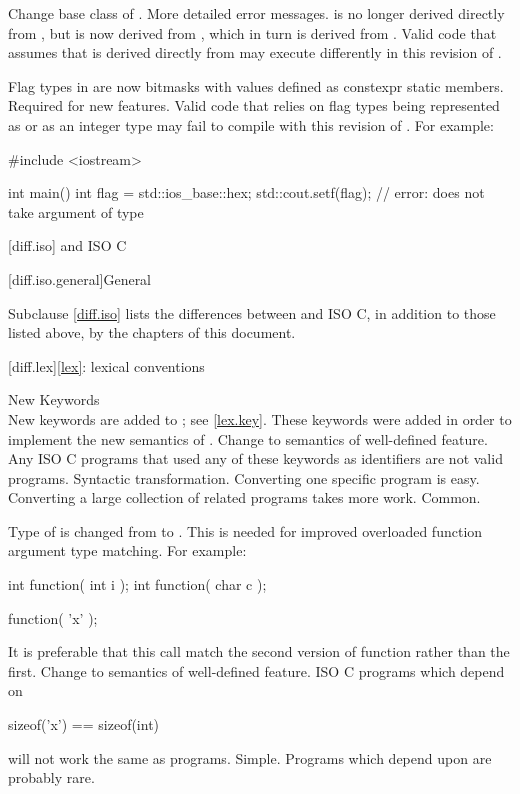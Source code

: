 \change
Change base class of .
\rationale
More detailed error messages.
\effect
{} is no longer derived directly from
, but is now derived from ,
which in turn is derived from . Valid \CppIII{} code
that assumes that  is derived directly from
 may execute differently in this revision of \Cpp{}.

\change
Flag types in  are now bitmasks with values
defined as constexpr static members.
\rationale
Required for new features.
\effect
Valid \CppIII{} code that relies on  flag types being
represented as  or as an integer type may fail to compile
with this revision of \Cpp{}.
For example:
\begin{codeblock}
#include <iostream>

int main() {
  int flag = std::ios_base::hex;
  std::cout.setf(flag);         // error:  does not take argument of type 
}
\end{codeblock}

[diff.iso]{\Cpp{} and ISO C}

[diff.iso.general]{General}

\pnum
{}%
Subclause \ref{diff.iso} lists the differences between \Cpp{} and ISO C,
in addition to those listed above,
by the chapters of this document.

[diff.lex]{\ref{lex}: lexical conventions}

\change
New Keywords\\
New keywords are added to \Cpp{};
see \ref{lex.key}.
\rationale
These keywords were added in order to implement the new
semantics of \Cpp{}.
\effect
Change to semantics of well-defined feature.
Any ISO C programs that used any of these keywords as identifiers
are not valid \Cpp{} programs.
\difficulty
Syntactic transformation.
Converting one specific program is easy.
Converting a large collection
of related programs takes more work.
\howwide
Common.

\change
Type of  is changed from  to .
\rationale
This is needed for improved overloaded function argument type
matching. For example:
\begin{codeblock}
int function( int i );
int function( char c );

function( 'x' );
\end{codeblock}
It is preferable that this call match the second version of
function rather than the first.
\effect
Change to semantics of well-defined feature.
ISO C programs which depend on
\begin{codeblock}
sizeof('x') == sizeof(int)
\end{codeblock}
will not work the same as \Cpp{} programs.
\difficulty
Simple.
\howwide
Programs which depend upon  are probably rare.

